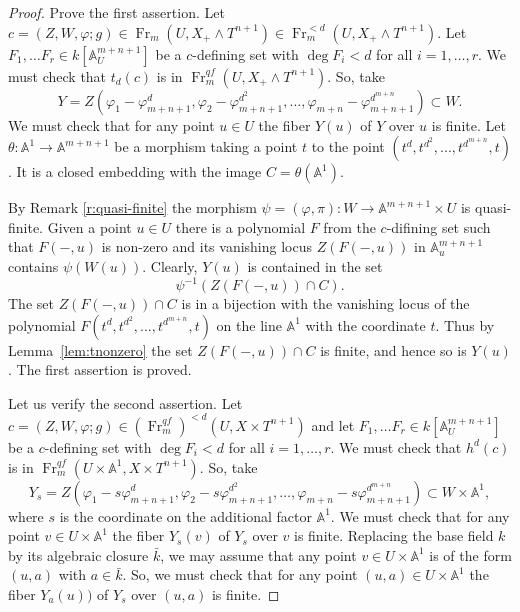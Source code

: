 \documentclass[a4paper,11pt,reqno]{amsart}
\begin{document}
\begin{proof}
Prove the first assertion. Let $c=(Z,W,{\varphi};g)\in {\operatorname{Fr}}_m(U,X_+\wedge
T^{n+1}) \in {\operatorname{Fr}}^{<d}_m(U,X_+\wedge T^{n+1})$. Let $F_1,\ldots F_r
\in k[{\mathbb{A}}^{m+n+1}_U]$  be a $c$-defining set with $\deg F_i<d$ for
all $i=1,\ldots,r$. We must check that $t_d(c)$ is in
${\operatorname{Fr}}^{qf}_m(U,X_+\wedge T^{n+1})$. So, take
$$Y=Z({\varphi}_1-{\varphi}_{m+n+1}^d,{\varphi}_2-{\varphi}_{m+n+1}^{d^2},\ldots,{\varphi}_{m+n}-{\varphi}_{m+n+1}^{d^{m+n}})\subset W.$$
We must check that for any point $u\in U$ the fiber $Y(u)$ of $Y$
over $u$ is finite. Let $\theta: {\mathbb{A}}^1\to {\mathbb{A}}^{m+n+1}$ be a morphism
taking a point $t$ to the point $(t^d,t^{d^2},...,t^{d^{m+n}},t)$.
It is a closed embedding with the image $C=\theta({\mathbb{A}}^1)$.

By Remark \ref{r:quasi-finite} the morphism $\psi=({\varphi},\pi):W\to
{\mathbb{A}}^{m+n+1}\times U$ is quasi-finite. Given a point $u\in U$ there is
a polynomial $F$ from the $c$-difining set such that $F(-,u)$ is
non-zero and its vanishing locus $Z(F(-,u))$ in ${\mathbb{A}}^{m+n+1}_u$
contains $\psi(W(u))$. Clearly, $Y(u)$ is contained in the set
   $$\psi^{-1}(Z(F(-,u))\cap C).$$
The set $Z(F(-,u))\cap C$ is in a bijection with the vanishing locus
of the polynomial $F(t^d,t^{d^2},...,t^{d^{m+n}},t)$ on the line
${\mathbb{A}}^1$ with the coordinate $t$. Thus by Lemma~\ref{lem:tnonzero} the
set $Z(F(-,u))\cap C$ is finite, and hence so is $Y(u)$. The first
assertion is proved.

Let us verify the second assertion. Let $c=(Z,W,{\varphi};g) \in
({\operatorname{Fr}}^{qf}_m)^{<d}(U,X\times T^{n+1})$ and let $F_1,\ldots F_r \in
k[{\mathbb{A}}^{m+n+1}_U]$  be a $c$-defining set with $\deg F_i<d$ for all
$i=1,\ldots,r$. We must check that $h^d(c)$ is in
${\operatorname{Fr}}^{qf}_m(U\times {\mathbb{A}}^1,X\times T^{n+1})$. So, take
   $$Y_s=Z({\varphi}_1-s{\varphi}_{m+n+1}^d,{\varphi}_2-s{\varphi}_{m+n+1}^{d^2},\ldots,{\varphi}_{m+n}-s{\varphi}_{m+n+1}^{d^{m+n}})\subset W\times {\mathbb{A}}^1,$$
where $s$ is the coordinate on the additional factor ${\mathbb{A}}^1$. We must
check that for any point $v\in U\times {\mathbb{A}}^1$ the fiber $Y_s(v)$ of
$Y_s$ over $v$ is finite. Replacing the base field $k$ by its
algebraic closure $\bar k$, we may assume that any point $v\in
U\times {\mathbb{A}}^1$ is of the form $(u,a)$ with $a\in \bar k$. So, we must
check that for any point $(u,a)\in U\times {\mathbb{A}}^1$ the fiber $Y_a(u))$
of $Y_s$ over $(u,a)$ is finite.


\end{proof}
\end{document}
